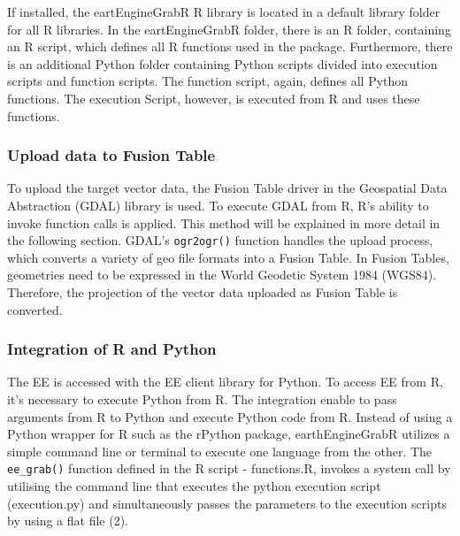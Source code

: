 If installed, the eartEngineGrabR R library is located in a default library folder for all R libraries. In the eartEngineGrabR folder, there is an R folder, containing an R script, which defines all R functions used in the package. Furthermore, there is an additional Python folder containing Python scripts divided into execution scripts and function scripts. The function script, again, defines all Python functions. The execution Script, however, is executed from R and uses these functions.

\subsubsection{Upload data to Fusion Table}

To upload the target vector data, the Fusion Table driver in the Geospatial Data Abstraction (GDAL) library is used. To execute GDAL from R, R's ability to invoke function calls is applied. This method will be explained in more detail in the following section. GDAL's \texttt{ogr2ogr()}  function handles the upload process, which converts a variety of geo file formats into a Fusion Table. In Fusion Tables, geometries need to be expressed in the World Geodetic System 1984 (WGS84). Therefore, the projection of the vector data uploaded as Fusion Table is converted.

\subsubsection{Integration of R and Python}

The EE is accessed with the EE client library for Python. To access EE from R, it's necessary to execute Python from R. The integration enable to pass arguments from R to Python and execute Python code from R. Instead of using a Python wrapper for R such as the rPython package, earthEngineGrabR utilizes a simple command line or terminal to execute one language from the other. The \texttt{ee\_grab()} function defined in the R script - functions.R, invokes a system call by utilising the command line that executes the python execution script (execution.py) and simultaneously passes the parameters to the execution scripts by using a flat file (2). 

